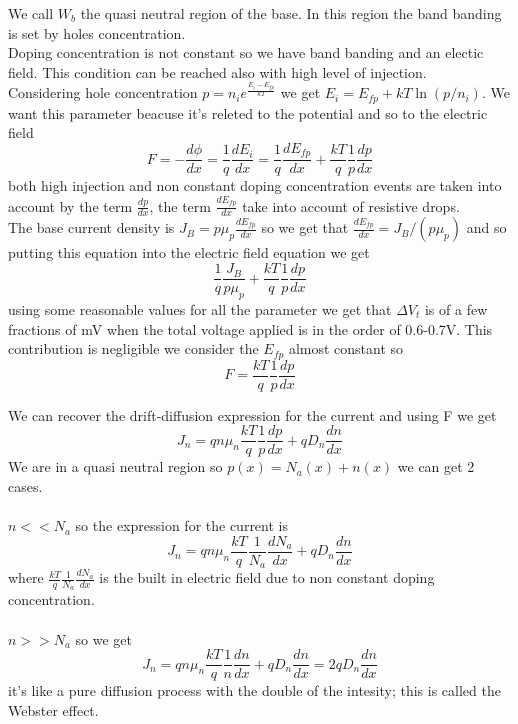 We call $W_b$ the quasi neutral region of the base. In this region the band banding is set by holes concentration.\\
Doping concentration is not constant so we have band banding and an electic field. This condition can be reached also with high level of injection.\\
Considering hole concentration $p=n_ie^{\frac{E_i-E_{fp}}{kT}}$ we get $E_i=E_{fp}+kT\ln(p/n_i)$. We want this parameter beacuse it's releted to the potential and so to the electric field
\begin{equation}
F=-\frac{d\phi}{dx}=\frac{1}{q}\frac{dE_{i}}{dx}=\frac{1}{q}\frac{dE_{fp}}{dx}+\frac{kT}{q}\frac{1}{p}\frac{dp}{dx}
\end{equation}
both high injection and non constant doping concentration events are taken into account by the term $\frac{dp}{dx}$, the term $\frac{dE_{fp}}{dx}$ take into account of resistive drops.\\
\vspace{5mm}
The base current density is $J_B=p\mu_p \frac{dE_{fp}}{dx}$ so we get that $\frac{dE_{fp}}{dx}=J_B/(p\mu_p)$ and so putting this equation into the electric field equation we get 
\begin{equation}
\frac{1}{q}\frac{J_B}{p\mu_p}+\frac{kT}{q}\frac{1}{p}\frac{dp}{dx}
\end{equation}
using some reasonable values for all the parameter we get that $\Delta V_t$ is of a few fractions of mV when the total voltage applied is in the order of 0.6-0.7V. This contribution is negligible we consider the $E_{fp}$ almost constant so 
\begin{equation}
F=\frac{kT}{q}\frac{1}{p}\frac{dp}{dx}
\end{equation}

\vspace{5mm}
We can recover the drift-diffusion expression for the current and using F we get
\begin{equation}
J_n=qn\mu_n \frac{kT}{q}\frac{1}{p}\frac{dp}{dx}+qD_n \frac{dn}{dx}
\end{equation}
We are in a quasi neutral region so $p(x)=N_a(x)+n(x)$ we can get 2 cases.\\
\vspace{3mm}
\\
$n<<N_a$ so the expression for the current is 
\begin{equation}
J_n=qn\mu_n \frac{kT}{q}\frac{1}{N_a}\frac{dN_a}{dx}+qD_n \frac{dn}{dx}
\end{equation}
where $\frac{kT}{q}\frac{1}{N_a}\frac{dN_a}{dx}$ is the built in electric field due to non constant doping concentration.\\
\vspace{3mm}
\\
$n>>N_a$ so we get 
\begin{equation}
J_n=qn\mu_n \frac{kT}{q}\frac{1}{n}\frac{dn}{dx}+qD_n \frac{dn}{dx}=2qD_n\frac{dn}{dx}
\end{equation}
it's like a pure diffusion process with the double of the intesity; this is called the Webster effect.\\


